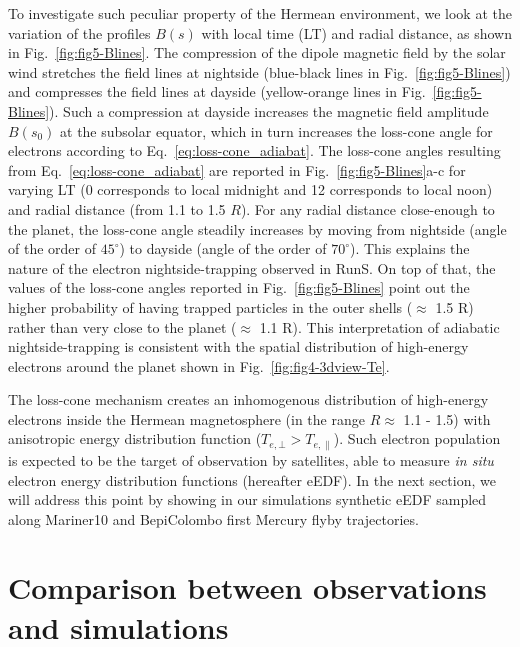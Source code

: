 \documentclass{aa}
\begin{document}
To investigate such peculiar property of the Hermean environment, we look at the variation of the profiles $B(s)$ with local time (LT) and radial distance, as shown in Fig.~\ref{fig:fig5-Blines}.
The compression of the dipole magnetic field by the solar wind stretches the field lines at nightside (blue-black lines in Fig.~\ref{fig:fig5-Blines}) and compresses the field lines at dayside (yellow-orange lines in Fig.~\ref{fig:fig5-Blines}). Such a compression  at dayside increases the magnetic field amplitude $B(s_0)$ at the subsolar equator, which in turn increases the loss-cone angle for electrons according to Eq.~\ref{eq:loss-cone_adiabat}.
The loss-cone angles resulting from Eq.~\ref{eq:loss-cone_adiabat} are reported in Fig.~\ref{fig:fig5-Blines}a-c for varying LT (0 corresponds to local midnight and 12 corresponds to local noon) and radial distance (from 1.1 to 1.5 $R$).
For any radial distance close-enough to the planet, the loss-cone angle steadily increases by moving from nightside (angle of the order of $45^{\circ}$) to dayside (angle of the order of $70^{\circ}$). This explains the nature of the electron nightside-trapping observed in RunS. On top of that, the values of the loss-cone angles reported in Fig.~\ref{fig:fig5-Blines} point out the higher probability of having trapped particles in the outer shells ($\approx$ 1.5 R) rather than very close to the planet ($\approx$ 1.1 R). This interpretation of adiabatic nightside-trapping is consistent with the spatial distribution of high-energy electrons around the planet shown in Fig.~\ref{fig:fig4-3dview-Te}.

The loss-cone mechanism creates an inhomogenous distribution of high-energy electrons inside the Hermean magnetosphere (in the range $R\approx$ 1.1 - 1.5) with anisotropic energy distribution function ($T_{e,\bot}>T_{e,\parallel}$).
Such electron population is expected to be the target of observation by satellites, able to measure \textit{in situ} electron energy distribution functions (hereafter eEDF).
In the next section, we will address this point by showing in our simulations synthetic eEDF sampled along Mariner10 and BepiColombo first Mercury flyby trajectories.



\section{Comparison between observations and simulations}\label{sec:Result_comparison-data}
\end{document}
